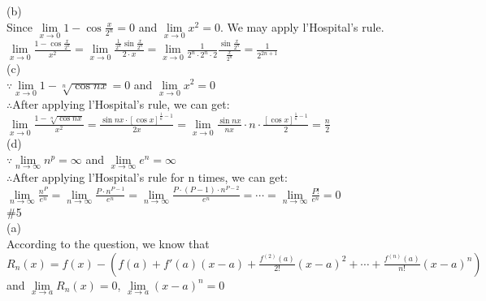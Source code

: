 \documentclass{article}
\begin{document}
(b)\\

Since $\lim \limits_{x \to 0}1-\cos\displaystyle\frac{x}{2^n}=0$ and $\lim \limits_{x \to 0}x^2=0$. We may apply l'Hospital's rule.\\

$\lim \limits_{x \to 0}\displaystyle\frac{1-\cos\frac{x}{2^n}}{x^2}=\lim \limits_{x \to 0}\frac{\frac{1}{2^n}\sin\frac{x}{2^n}}{2\cdot x}=\lim \limits_{x \to 0}\frac{1}{2^n\cdot2^n\cdot2}\frac{\sin\frac{x}{2^n}}{\frac{x}{2^n}}=\frac{1}{2^{2n+1}}$\\

(c)\\

$\because$\qquad$\lim \limits_{x \to 0}1-\sqrt[n]{\cos nx}=0$ and $\lim \limits_{x \to 0}x^2=0$\\

$\therefore$\qquad After applying l'Hospital's rule, we can get:\\

\qquad\quad$\lim \limits_{x \to 0}\displaystyle\frac{1-\sqrt[n]{\cos nx}}{x^2}=\frac{\sin nx\cdot[\cos x]^{\frac{1}{n}-1}}{2x}=\lim \limits_{x \to 0}\frac{\sin {nx}}{nx}\cdot n\cdot\frac{[\cos x]^{\frac{1}{n}-1}}{2}=\frac{n}{2}$\\

(d)\\

$\because$\qquad$\lim \limits_{n \to \infty}n^p=\infty$ and $\lim \limits_{x \to \infty}e^n=\infty$\\

$\therefore$\qquad After applying l'Hospital's rule for n times, we can get:\\

\qquad\quad$\lim \limits_{n \to \infty}\displaystyle\frac{n^P}{e^n}=\lim \limits_{n \to \infty}\frac{P\cdot n^{P-1}}{e^n}=\lim \limits_{n \to \infty}\frac{P\cdot(P-1)\cdot n^{P-2}}{e^n}=\cdots=\lim \limits_{n \to \infty}\frac{P!}{e^n}=0$\\

\textcolor[rgb]{0.00,0.00,0.50}{\#5}\\

(a)\\

According to the question, we know that $R_n(x)=f(x)-\left(f(a)+f'(a)(x-a)+\displaystyle\frac{f^{(2)}(a)}{2!}(x-a)^2+\cdots+\frac{f^{(n)}(a)}{n!}(x-a)^n\right)$\\

and $\lim \limits_{x \to a}R_n(x)=0$, $\lim \limits_{x \to a}(x-a)^n=0$\\
\end{document}

